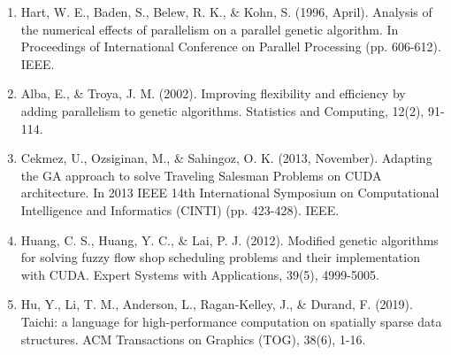 \documentclass[conference]{IEEEtran}
\begin{document}
\begin{enumerate}
    \item Hart, W. E., Baden, S., Belew, R. K., \& Kohn, S. (1996, April). Analysis of
          the numerical effects of parallelism on a parallel genetic algorithm. In
          Proceedings of International Conference on Parallel Processing (pp. 606-612).
          IEEE.
    \item Alba, E., \& Troya, J. M. (2002). Improving flexibility and efficiency by
          adding parallelism to genetic algorithms. Statistics and Computing, 12(2),
          91-114.
    \item Cekmez, U., Ozsiginan, M., \& Sahingoz, O. K. (2013, November). Adapting the GA
          approach to solve Traveling Salesman Problems on CUDA architecture. In 2013
          IEEE 14th International Symposium on Computational Intelligence and Informatics
          (CINTI) (pp. 423-428). IEEE.
    \item Huang, C. S., Huang, Y. C., \& Lai, P. J. (2012). Modified genetic algorithms
          for solving fuzzy flow shop scheduling problems and their implementation with
          CUDA. Expert Systems with Applications, 39(5), 4999-5005.
    \item Hu, Y., Li, T. M., Anderson, L., Ragan-Kelley, J., \& Durand, F. (2019).
          Taichi: a language for high-performance computation on spatially sparse data
          structures. ACM Transactions on Graphics (TOG), 38(6), 1-16.
\end{enumerate}
\end{document}
